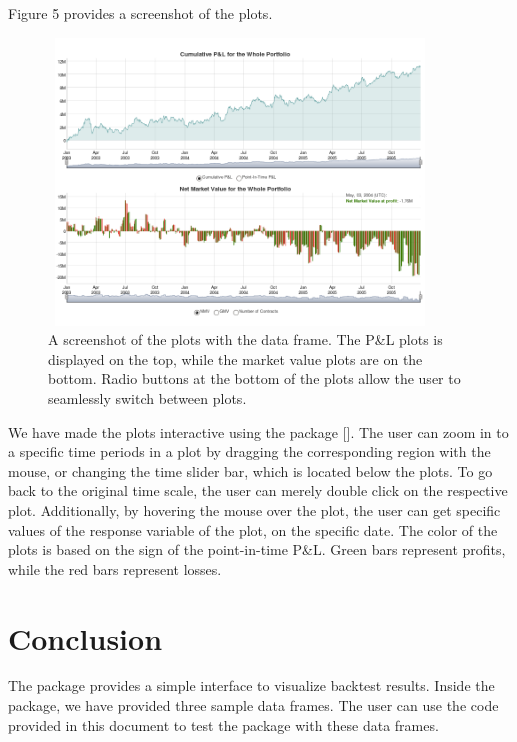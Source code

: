\documentclass[article]{jss}
\begin{document}
\noindent
Figure 5 provides a screenshot of the plots.

\begin{figure}[H]
\centering
\includegraphics[width = 4in, height = 3in]{img/plots.png}
\caption{A screenshot of the plots with the  data frame. The P\&L plots is displayed on the top, while the market value plots are on the bottom. Radio buttons at the bottom of the plots allow the user to seamlessly switch between plots.
}
\end{figure}

\noindent
We have made the plots interactive using the  package [\cite{dygraphs}]. The user can zoom in to a specific time periods in a plot by dragging the corresponding region with the mouse, or changing the time slider bar, which is located below the plots. To go back to the original time scale, the user can merely double click on the respective plot. Additionally, by hovering the mouse over the plot, the user can get specific values of the response variable of the plot, on the specific date. The color of the plots is based on the sign of the point-in-time P\&L. Green bars represent profits, while the red bars represent losses.






\section{Conclusion} \label{sec:conclusion}

The  package provides a simple  interface to visualize backtest results. Inside the package, we have provided three sample data frames. The user can use the code provided in this document to test the package with these data frames. 
\end{document}
